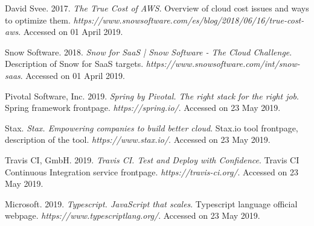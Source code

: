 \documentclass[licencjacka,en]{thesisclass}
\begin{document}
\begin{thebibliography}{99}
        David Svee. 2017.
        \textit{The True Cost of AWS}.
        Overview of cloud cost issues and ways to optimize them.
        \textit{https://www.snowsoftware.com/es/blog/2018/06/16/true-cost-aws}.
        Accessed on 01 April 2019.

        Snow Software. 2018.
        \textit{Snow for SaaS | Snow Software - The Cloud Challenge}.
        Description of Snow for SaaS targets.
        \textit{https://www.snowsoftware.com/int/snow-saas}.
        Accessed on 01 April 2019.

        Pivotal Software, Inc. 2019.
        \textit{Spring by Pivotal. The right stack for the right job}.
        Spring framework frontpage.
        \textit{https://spring.io/}.
        Accessed on 23 May 2019.

        Stax.
        \textit{Stax. Empowering companies to build better cloud}.
        Stax.io tool frontpage, description of the tool.
        \textit{https://www.stax.io/}.
        Accessed on 23 May 2019.

        Travis CI, GmbH. 2019.
        \textit{Travis CI. Test and Deploy with Confidence}.
        Travis CI Continuous Integration service frontpage.
        \textit{https://travis-ci.org/}.
        Accessed on 23 May 2019.

        Microsoft. 2019.
        \textit{Typescript. JavaScript that scales}.
        Typescript language official webpage.
        \textit{https://www.typescriptlang.org/}.
        Accessed on 23 May 2019.

    \end{thebibliography}
\end{document}

